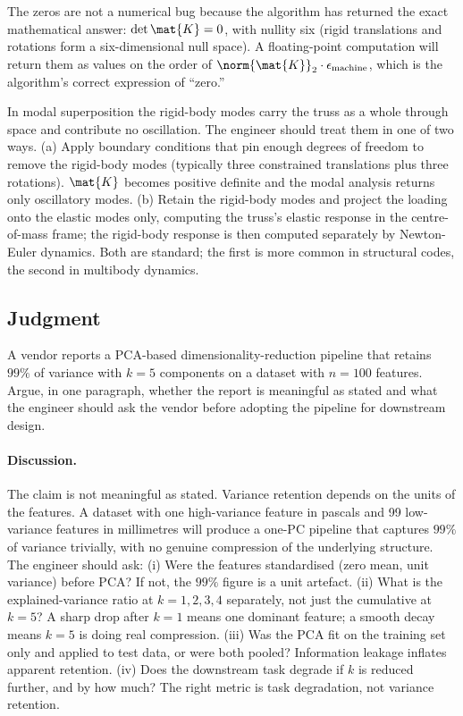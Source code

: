 The zeros are not a numerical bug because the algorithm has
returned the exact mathematical answer: $\det \mat{K} = 0$, with
nullity six (rigid translations and rotations form a
six-dimensional null space). A floating-point computation will
return them as values on the order of $\norm{\mat{K}}_{2} \cdot
\epsilon_{\text{machine}}$, which is the algorithm's correct
expression of ``zero.''

In modal superposition the rigid-body modes carry the truss as a
whole through space and contribute no oscillation. The engineer
should treat them in one of two ways. (a) Apply boundary conditions
that pin enough degrees of freedom to remove the rigid-body modes
(typically three constrained translations plus three rotations).
$\mat{K}$ becomes positive definite and the modal analysis returns
only oscillatory modes. (b) Retain the rigid-body modes and project
the loading onto the elastic modes only, computing the truss's
elastic response in the centre-of-mass frame; the rigid-body
response is then computed separately by Newton-Euler dynamics. Both
are standard; the first is more common in structural codes, the
second in multibody dynamics.

\subsection*{Judgment}

\begin{exercise}
A vendor reports a PCA-based dimensionality-reduction pipeline that
retains $99\%$ of variance with $k = 5$ components on a dataset
with $n = 100$ features. Argue, in one paragraph, whether the
report is meaningful as stated and what the engineer should ask
the vendor before adopting the pipeline for downstream design.
\end{exercise}

\paragraph{Discussion.}
The claim is not meaningful as stated. Variance retention depends
on the units of the features. A dataset with one
high-variance feature in pascals and 99 low-variance features in
millimetres will produce a one-PC pipeline that captures $99\%$ of
variance trivially, with no genuine compression of the underlying
structure. The engineer should ask: (i) Were the features
standardised (zero mean, unit variance) before PCA? If not, the
$99\%$ figure is a unit artefact. (ii) What is the explained-variance
ratio at $k = 1, 2, 3, 4$ separately, not just the cumulative at
$k = 5$? A sharp drop after $k = 1$ means one dominant feature;
a smooth decay means $k = 5$ is doing real compression. (iii) Was the
PCA fit on the training set only and applied to test data, or were
both pooled? Information leakage inflates apparent retention. (iv) Does
the downstream task degrade if $k$ is reduced further, and by how
much? The right metric is task degradation, not variance retention.

